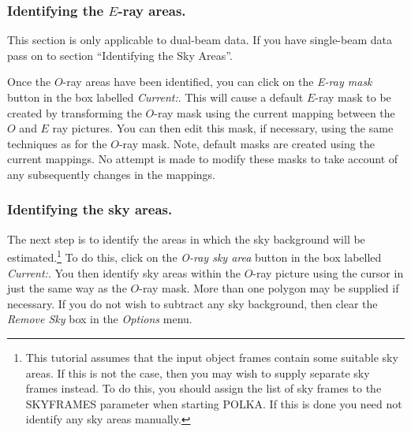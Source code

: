 \documentclass[11pt]{article}
\newcommand{\htmlref}[2]{#1}
\newcommand{\xlabel}[1]{}
\newcommand{\mylabel}[1] {\xlabel{#1}\label{#1}}
\begin{document}
\subsubsection {Identifying the $E$-ray areas.}
This section is only applicable to dual-beam data. If you have
single-beam data pass on to section ``\htmlref{Identifying the Sky Areas}
{TUT_SKY_AREAS}''.

Once the $O$-ray areas have been identified, you can click on the {\em
E-ray mask} button in the box labelled \htmlref{{\em
Current:}}{POLKA_CURRENT}. This will cause a default $E$-ray mask to be
created by transforming the $O$-ray mask using the current mapping
between the $O$ and $E$ ray pictures. You can then
\htmlref{edit}{POLKA_EDITING_POLYGONS} this mask, if necessary, using the
same techniques as for the $O$-ray mask. Note, default masks are created
using the current mappings. No attempt is made to modify these masks to
take account of any subsequently changes in the mappings.

\subsubsection {\mylabel{TUT_SKY_AREAS}Identifying the sky areas.}
The next step is to identify the areas in which the sky background will
be estimated.\footnote{This tutorial assumes that the input object frames
contain some suitable sky areas. If this is not the case, then you may
wish to supply separate sky frames instead. To do this, you should assign
the list of sky frames to the SKYFRAMES parameter when starting POLKA. If
this is done you need not identify any sky areas manually.} To do this,
click on the \emph{O-ray sky area} button in the box labelled
\htmlref{\emph{Current:}}{POLKA_CURRENT}. You then identify sky areas
within the $O$-ray picture using the cursor in just the same way as the
$O$-ray mask. More than one polygon may be supplied if necessary. If you
do not wish to subtract any sky background, then clear the
\htmlref{\emph{Remove Sky}}{POLKA_REMOVE_SKY} box in the
\htmlref{\emph{Options}}{POLKA_OPTIONS_MENU} menu.
\end{document}

